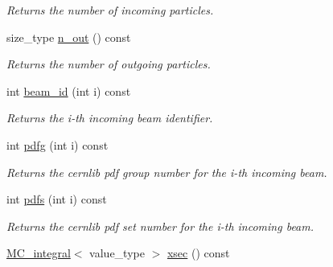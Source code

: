 \begin{DoxyCompactItemize}
\begin{DoxyCompactList}\small\item\em Returns the number of incoming particles. \end{DoxyCompactList}\item 
\hypertarget{a00450_abc07b7563a01931e291a3a99296984ba}{}size\+\_\+type \hyperlink{a00450_abc07b7563a01931e291a3a99296984ba}{n\+\_\+out} () const \label{a00450_abc07b7563a01931e291a3a99296984ba}

\begin{DoxyCompactList}\small\item\em Returns the number of outgoing particles. \end{DoxyCompactList}\item 
\hypertarget{a00450_ae8b9e47a20834f1a3a136e157265b53f}{}int \hyperlink{a00450_ae8b9e47a20834f1a3a136e157265b53f}{beam\+\_\+id} (int i) const \label{a00450_ae8b9e47a20834f1a3a136e157265b53f}

\begin{DoxyCompactList}\small\item\em Returns the i-\/th incoming beam identifier. \end{DoxyCompactList}\item 
\hypertarget{a00450_ab963ccd0bcebc4a23a1c8458f4a12d9b}{}int \hyperlink{a00450_ab963ccd0bcebc4a23a1c8458f4a12d9b}{pdfg} (int i) const \label{a00450_ab963ccd0bcebc4a23a1c8458f4a12d9b}

\begin{DoxyCompactList}\small\item\em Returns the cernlib pdf group number for the i-\/th incoming beam. \end{DoxyCompactList}\item 
\hypertarget{a00450_a0ede4675a8a1b5f5cd579b81b34dfef7}{}int \hyperlink{a00450_a0ede4675a8a1b5f5cd579b81b34dfef7}{pdfs} (int i) const \label{a00450_a0ede4675a8a1b5f5cd579b81b34dfef7}

\begin{DoxyCompactList}\small\item\em Returns the cernlib pdf set number for the i-\/th incoming beam. \end{DoxyCompactList}\item 
\hypertarget{a00450_a2ae209b5513c286010117df72fbd52f6}{}\hyperlink{a00368}{M\+C\+\_\+integral}$<$ value\+\_\+type $>$ \hyperlink{a00450_a2ae209b5513c286010117df72fbd52f6}{xsec} () const \label{a00450_a2ae209b5513c286010117df72fbd52f6}


\end{DoxyCompactItemize}
